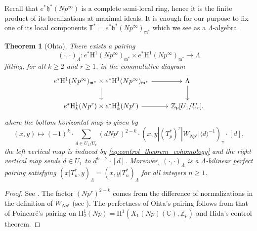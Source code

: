 \documentclass[12pt]{amsart}
\newcommand\bC{\mathbb{C}}
\newcommand\bT{\mathbb{T}}
\newcommand\Zp{{\mathbb{Z}_p}}
\newcommand\gh{\mathfrak{h}}
\newcommand\gm{\mathfrak{m}}
\newcommand{\HH}{\mathrm{H}}
\theoremstyle{defstyle}
\theoremstyle{thmstyle}
\newtheorem{theorem}[subsubsection]{Theorem}
\begin{document}
Recall that $e^*\gh^*(Np^\infty)$ is a complete semi-local ring, hence it is the finite product of its localizations at maximal ideals. It is enough for our purpose to fix one of its local components $\bT^*=e^*\gh^*(Np^\infty)_{\gm^*}$ which we see as a $\Lambda$-algebra. 
\begin{theorem}[Ohta]
	There exists a pairing 
	\begin{equation}\label{eq:ohta_pairing}
		(\cdot,\cdot)_{\Lambda} \colon e^*\HH^1(Np^\infty)_{\gm^*} \times e^*\HH^1(Np^\infty)_{\gm^*} \to \Lambda
	\end{equation}
	fitting, for all $k\geq 2$ and $r\geq 1$, in the commutative diagram
	\[\begin{tikzcd}
		e^*\HH^1(Np^\infty)_{\gm^*} \times e^*\HH^1(Np^\infty)_{\gm^*} \rar\dar & \Lambda \dar \\ 
		 e^*\HH_k^1(Np^r) \times e^*\HH_k^1(Np^r) \rar & \Zp[U_1/U_r],
	\end{tikzcd}\]
	where the bottom horizontal map is given by
	\begin{equation}\label{eq:ota_pairing_interpolation}
			(x,y)  \mapsto (-1)^{k}\cdot \sum_{d\in U_1/U_r} (dNp^r)^{2-k}\cdot (x,y|(T_p^*)^r|W_{Np^r}|\langle d \rangle^{-1})_\pi \cdot [d],
	\end{equation}
	the left vertical map is induced by \eqref{eq:control_theorem_cohomology} and the right vertical map sends $d\in U_1$ to $d^{k-2}\cdot[d]$. Moreover, $(\cdot,\cdot)_{\Lambda}$ is a $\Lambda$-bilinear perfect pairing satisfying $(x|T_n^*,y)_{\Lambda}=(x,y|T_n^*)_{\Lambda}$ for all integers $n\geq 1$.

\end{theorem}
\begin{proof}
	See \cite[Thm. 4.2.5 and Cor. 4.2.8]{ohtacrelle}. The factor $(Np^r)^{2-k}$ comes from the difference of normalizations in the definition of $W_{Np^r}$ (see \cite[(4.1.3)]{ohtacrelle}). The perfectness of Ohta's pairing follows from that of Poincaré's pairing on $\HH^1_2(Np)=\HH^1(X_1(Np)(\bC),\Zp)$ and Hida's control theorem. 
\end{proof}
\end{document}
